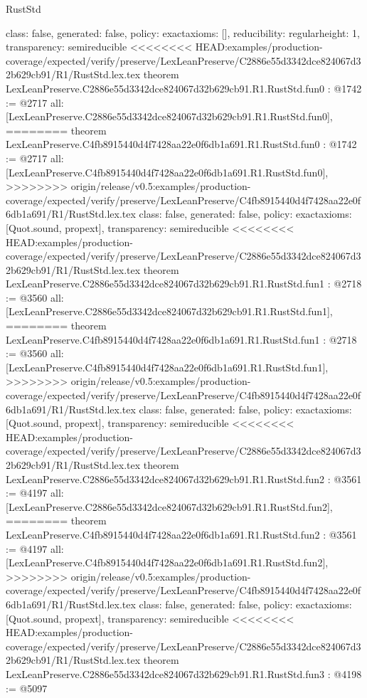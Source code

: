 \begin{lexlean}{RustStd}
\begin{coremodule}
{\begin{coremodule}
{{{  class: false,
  generated: false,
  policy: exact{axioms: []},
  reducibility: regular{height: 1},
  transparency: semireducible
}
<<<<<<<< HEAD:examples/production-coverage/expected/verify/preserve/LexLeanPreserve/C2886e55d3342dce824067d32b629cb91/R1/RustStd.lex.tex
theorem LexLeanPreserve.C2886e55d3342dce824067d32b629cb91.R1.RustStd.fun0 : @1742 := @2717 {
  all: [LexLeanPreserve.C2886e55d3342dce824067d32b629cb91.R1.RustStd.fun0],
========
theorem LexLeanPreserve.C4fb8915440d4f7428aa22e0f6db1a691.R1.RustStd.fun0 : @1742 := @2717 {
  all: [LexLeanPreserve.C4fb8915440d4f7428aa22e0f6db1a691.R1.RustStd.fun0],
>>>>>>>> origin/release/v0.5:examples/production-coverage/expected/verify/preserve/LexLeanPreserve/C4fb8915440d4f7428aa22e0f6db1a691/R1/RustStd.lex.tex
  class: false,
  generated: false,
  policy: exact{axioms: [Quot.sound, propext]},
  transparency: semireducible
}
<<<<<<<< HEAD:examples/production-coverage/expected/verify/preserve/LexLeanPreserve/C2886e55d3342dce824067d32b629cb91/R1/RustStd.lex.tex
theorem LexLeanPreserve.C2886e55d3342dce824067d32b629cb91.R1.RustStd.fun1 : @2718 := @3560 {
  all: [LexLeanPreserve.C2886e55d3342dce824067d32b629cb91.R1.RustStd.fun1],
========
theorem LexLeanPreserve.C4fb8915440d4f7428aa22e0f6db1a691.R1.RustStd.fun1 : @2718 := @3560 {
  all: [LexLeanPreserve.C4fb8915440d4f7428aa22e0f6db1a691.R1.RustStd.fun1],
>>>>>>>> origin/release/v0.5:examples/production-coverage/expected/verify/preserve/LexLeanPreserve/C4fb8915440d4f7428aa22e0f6db1a691/R1/RustStd.lex.tex
  class: false,
  generated: false,
  policy: exact{axioms: [Quot.sound, propext]},
  transparency: semireducible
}
<<<<<<<< HEAD:examples/production-coverage/expected/verify/preserve/LexLeanPreserve/C2886e55d3342dce824067d32b629cb91/R1/RustStd.lex.tex
theorem LexLeanPreserve.C2886e55d3342dce824067d32b629cb91.R1.RustStd.fun2 : @3561 := @4197 {
  all: [LexLeanPreserve.C2886e55d3342dce824067d32b629cb91.R1.RustStd.fun2],
========
theorem LexLeanPreserve.C4fb8915440d4f7428aa22e0f6db1a691.R1.RustStd.fun2 : @3561 := @4197 {
  all: [LexLeanPreserve.C4fb8915440d4f7428aa22e0f6db1a691.R1.RustStd.fun2],
>>>>>>>> origin/release/v0.5:examples/production-coverage/expected/verify/preserve/LexLeanPreserve/C4fb8915440d4f7428aa22e0f6db1a691/R1/RustStd.lex.tex
  class: false,
  generated: false,
  policy: exact{axioms: [Quot.sound, propext]},
  transparency: semireducible
}
<<<<<<<< HEAD:examples/production-coverage/expected/verify/preserve/LexLeanPreserve/C2886e55d3342dce824067d32b629cb91/R1/RustStd.lex.tex
theorem LexLeanPreserve.C2886e55d3342dce824067d32b629cb91.R1.RustStd.fun3 : @4198 := @5097 {
}}}}}}
\end{coremodule}}
\end{coremodule}
\end{lexlean}

